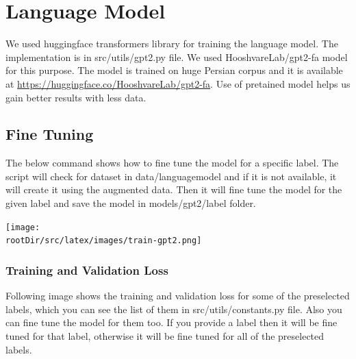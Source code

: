\documentclass[12pt, letterpaper]{article}
\def\rootDir{../..}
\begin{document}
    \section{Language Model}\label{sec:language-model}
    We used huggingface transformers library for training the language model. The implementation is in src\slash utils\slash gpt2.py file. We used HooshvareLab/gpt2-fa model for this purpose. The model is trained on huge Persian corpus and it is available at \url{https://huggingface.co/HooshvareLab/gpt2-fa}. Use of pretained model helps us gain better results with less data.
    
    \subsection{Fine Tuning}\label{subsec:fine-tuning-gpt2}
    The below command shows how to fine tune the model for a specific label. The script will check for dataset in data\slash languagemodel and if it is not available, it will create it using the augmented data. Then it will fine tune the model for the given label and save the model in models\slash gpt2\slash label folder.
    \begin{center}
        \texttt{[image: \\rootDir/src/latex/images/train-gpt2.png]}
    \end{center}

    \subsubsection{Training and Validation Loss}\label{subsubsec:training-and-validation-loss}
    Following image shows the training and validation loss for some of the preselected labels, which you can see the list of them in src\slash utils\slash constants.py file. Also you can fine tune the model for them too. If you provide a label then it will be fine tuned for that label, otherwise it will be fine tuned for all of the preselected labels.
    \begin{figure}[H]
        \centering
        
    \end{figure}
\end{document}
